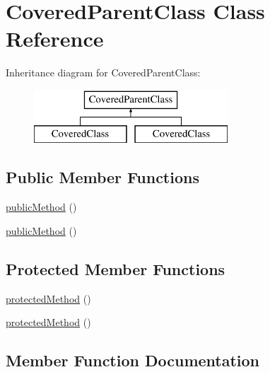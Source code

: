 \hypertarget{class_foo_1_1_covered_parent_class}{}\section{Covered\+Parent\+Class Class Reference}
\label{class_foo_1_1_covered_parent_class}
Inheritance diagram for Covered\+Parent\+Class\+:\begin{figure}[H]
\begin{center}
\leavevmode
\includegraphics[height=2.000000cm]{class_foo_1_1_covered_parent_class}
\end{center}
\end{figure}
\subsection*{Public Member Functions}
\begin{DoxyCompactItemize}
\item 
\mbox{\hyperlink{class_foo_1_1_covered_parent_class_ab07dfd901b43d1dcdbc2d116d7f5a566}{public\+Method}} ()
\item 
\mbox{\hyperlink{class_foo_1_1_covered_parent_class_ab07dfd901b43d1dcdbc2d116d7f5a566}{public\+Method}} ()
\end{DoxyCompactItemize}
\subsection*{Protected Member Functions}
\begin{DoxyCompactItemize}
\item 
\mbox{\hyperlink{class_foo_1_1_covered_parent_class_ab718380de0530a34b65401f7e81a211f}{protected\+Method}} ()
\item 
\mbox{\hyperlink{class_foo_1_1_covered_parent_class_ab718380de0530a34b65401f7e81a211f}{protected\+Method}} ()
\end{DoxyCompactItemize}


\subsection{Member Function Documentation}
\mbox{\label{class_foo_1_1_covered_parent_class_ab718380de0530a34b65401f7e81a211f}} 
